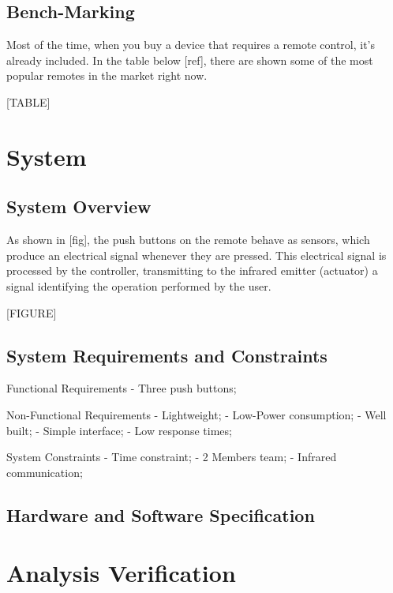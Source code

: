 \documentclass[12pt, letterpaper]{report}
\begin{document}
\subsection{Bench-Marking}
Most of the time, when you buy a device that requires a remote control, it's already included. In the table below [ref], there are shown some of the most popular remotes in the market right now.

[TABLE]

\section{System}
\subsection{System Overview}
As shown in [fig], the push buttons on the remote behave as sensors, which produce an electrical signal whenever they are pressed. This electrical signal is processed by the controller, transmitting to the infrared emitter (actuator) a signal identifying the operation performed by the user. 

[FIGURE]

\subsection{System Requirements and Constraints}
Functional Requirements
- Three push buttons;

Non-Functional Requirements
- Lightweight;
- Low-Power consumption;
- Well built;
- Simple interface;
- Low response times;

System Constraints
- Time constraint;
- 2 Members team;
- Infrared communication;
\subsection{Hardware and Software Specification}

\section{Analysis Verification}


\end{document}
